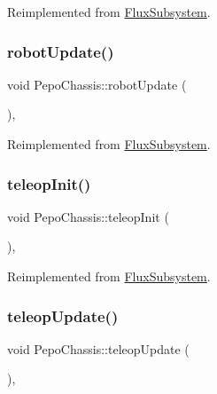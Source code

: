 Reimplemented from \hyperlink{classFluxSubsystem_aacd5ddfcadda0866d5e838de09a60d63}{Flux\+Subsystem}.

\mbox{\label{classPepoChassis_acd6fa29da41ac5108af7e3a1f15218aa}} 
\subsubsection{\texorpdfstring{robot\+Update()}{robotUpdate()}}
{\footnotesize\ttfamily void Pepo\+Chassis\+::robot\+Update (\begin{DoxyParamCaption}{ }\end{DoxyParamCaption})\hspace{0.3cm}{\ttfamily [override]}, {\ttfamily [virtual]}}



Reimplemented from \hyperlink{classFluxSubsystem_ac2b1c08b53251870e945edf7080c1549}{Flux\+Subsystem}.

\mbox{\label{classPepoChassis_a44dbc37a56fe98d7b57af840e8da73b2}} 
\subsubsection{\texorpdfstring{teleop\+Init()}{teleopInit()}}
{\footnotesize\ttfamily void Pepo\+Chassis\+::teleop\+Init (\begin{DoxyParamCaption}{ }\end{DoxyParamCaption})\hspace{0.3cm}{\ttfamily [override]}, {\ttfamily [virtual]}}



Reimplemented from \hyperlink{classFluxSubsystem_aec6d05e4f80c3783684598fb92ad2e55}{Flux\+Subsystem}.

\mbox{\label{classPepoChassis_af863b7df039af7051b08c051f744e429}} 
\subsubsection{\texorpdfstring{teleop\+Update()}{teleopUpdate()}}
{\footnotesize\ttfamily void Pepo\+Chassis\+::teleop\+Update (\begin{DoxyParamCaption}{ }\end{DoxyParamCaption})\hspace{0.3cm}{\ttfamily [override]}, {\ttfamily [virtual]}}



